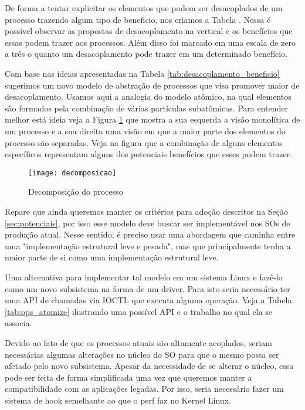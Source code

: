 De forma a tentar explicitar os elementos que podem ser desacoplados de um
processo trazendo algum tipo de beneficio, nos criamos a Tabela
\cite{tab:desacoplamento_beneficio}. Nessa é possível observar as propostas de
desacoplamento na vertical e os benefícios que essas podem trazer aos
processos. Além disso foi marcado em uma escala de zero a três o quanto um
desacoplamento pode trazer em um determinado benefício.



Com base nas ideias apresentadas na Tabela \ref{tab:desacoplamento_beneficio}
sugerimos um novo modelo de abstração de processos que visa promover maior de
desacoplamento. Usamos aqui a analogia do modelo atômico, na qual elementos são
formados pela combinação de várias partículas subatômicas. Para entender melhor
está ideia veja a Figura \ref{fig:decomposicao_proc} que mostra a sua esquerda
a visão monolítica de um processo e a sua direita uma visão em que a maior
parte dos elementos do processo são separadas. Veja na figura que a combinação
de alguns elementos específicos representam alguns dos potenciais benefícios
que esses podem trazer.

\begin{figure}[!h]
  \centering
  \texttt{[image: decomposicao]}
  \caption{Decomposição do processo}
  \label{fig:decomposicao_proc}
\end{figure}

Repare que ainda queremos manter os critérios para adoção descritos na Seção
\ref{sec:potenciais}, por isso esse modelo deve buscar ser implementável nos
SOs de produção atual. Nesse sentido, é preciso usar uma abordagem que caminha
entre uma "implementação estrutural leve e pesada", mas que principalmente
tenha a maior parte de si como uma implementação estrutural leve.


Uma alternativa para implementar tal modelo em um sistema Linux e fazê-lo como
um novo subsistema na forma de um driver. Para isto seria necessário ter uma
API de chamadas via IOCTL que executa alguma operação. Veja a Tabela \ref{tab:ops_atomize}
ilustrando uma possível API e o trabalho no qual ela se associa.



Devido ao fato de que os processos atuais são altamente acoplados, seriam
necessárias algumas alterações no núcleo do SO para que o mesmo possa ser
afetado pelo novo subsistema. Apesar da necessidade de se alterar o núcleo,
essa pode ser feita de forma simplificada uma vez que queremos manter a
compatibilidade com as aplicações legadas. Por isso, seria necessário fazer um
sistema de hook semelhante ao que o perf faz no Kernel Linux.

